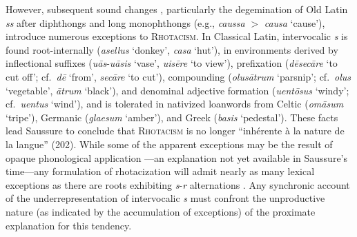 \noindent
However, subsequent sound changes \citep[e.g.,][]{Baldi1994,Safarewicz1932}, particularly the degemination of Old Latin \emph{ss} after diphthongs and long monophthongs (e.g., \emph{caussa} $>$ \emph{causa} `cause'), introduce numerous exceptions to \textsc{Rhotacism}.
In Classical Latin, intervocalic \emph{s} is found root-internally (\emph{asellus} `donkey', \emph{casa} `hut'), in environments derived by inflectional suffixes (\emph{uās}-\emph{uāsis} `vase', \emph{uisēre} `to view'), prefixation (\emph{dēsecāre} `to cut off'; cf.~\emph{dē} `from', \emph{secāre} `to cut'), compounding (\emph{olusātrum} `parsnip'; cf.~\emph{olus} `vegetable', \emph{ātrum} `black'), and denominal adjective formation (\emph{uentōsus} `windy'; cf.~\emph{uentus} `wind'), and is tolerated in nativized loanwords from Celtic (\emph{omāsum} `tripe'), Germanic (\emph{glaesum} `amber'), and Greek (\emph{basis} `pedestal').
These facts lead Saussure to conclude that \textsc{Rhotacism} is no longer ``inhérente à la nature de la langue'' (202).
While some of the apparent exceptions may be the result of opaque phonological application \citep{Heslin1987}---an explanation not yet available in Saussure's time---any formulation of rhotacization will admit nearly as many lexical exceptions as there are roots exhibiting \emph{s}-\emph{r} alternations \citep{GormanInPressc}.
Any synchronic account of the underrepresentation of intervocalic \emph{s} must confront the unproductive nature (as indicated by the accumulation of exceptions) of the proximate explanation for this tendency.


